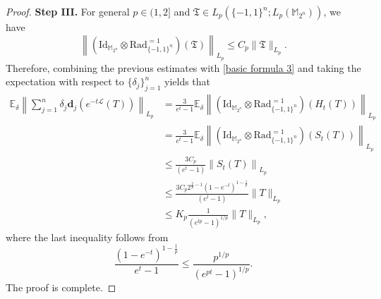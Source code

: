 \documentclass{amsbook}
\theoremstyle{definition}
\theoremstyle{remark}
\numberwithin{section}{chapter}
\numberwithin{equation}{chapter}
\newcommand{\M}{\mathbb{M}}
\newcommand{\1}{\mathbf{1}}
\newcommand{\dc}{\mathbf{d}}
\begin{document}
\begin{proof}
{\bf Step III.} For general $p\in(1,2]$ and $\mathfrak{T}\in  L_{p}(\{-1,1\}^{n};L_{p}(\M_{2^{n}}))$, we have
\[\left\|\left(\mathrm{Id}_{\M_{2^{n}}}\otimes \mathrm{Rad}^{=1}_{\{-1,1\}^{n}}\right)(\mathfrak{T})\right\|_{L_{p}}\leq C_p\|\mathfrak{T}\|_{L_{p}}.\] 
Therefore, combining the previous estimates with \eqref{basic formula 3} and taking the expectation with respect to $\{\delta_{j}\}_{j=1}^{n}$ yields that
\begin{equation}\label{basic formula 4}
\begin{split}
\mathbb{E}_{\delta}\left\|\sum_{j=1}^{n}\delta_{j}\dc_{j}(e^{-t\mathcal{L}}(T))\right\|_{L_{p}}&=\frac{3}{e^{t}-1}\mathbb{E}_{\delta}\left\|\left(\mathrm{Id}_{\M_{2^{n}}}\otimes \mathrm{Rad}^{=1}_{\{-1,1\}^{n}}\right)(H_{t}(T))\right\|_{L_{p}}\\
&=\frac{3}{e^{t}-1}\mathbb{E}_{\delta}\left\|\left(\mathrm{Id}_{\M_{2^{n}}}\otimes \mathrm{Rad}^{=1}_{\{-1,1\}^{n}}\right)(S_{t}(T))\right\|_{L_{p}}\\
&\leq \frac{3C_p}{(e^{t}-1)}\left\|S_{t}(T)\right\|_{L_{p}}\\
&\leq \frac{3C_p2^{\frac{2}{p}-1}(1-e^{-t})^{1-\frac{1}{p}}}{(e^{t}-1)}\|T\|_{L_{p}}\\
&\leq K_p\frac{1}{(e^{tp}-1)^{1/p}}\|T\|_{L_{p}},
\end{split}
\end{equation}
where the last inequality follows from
\[
\frac{(1-e^{-t})^{1-\frac1p}}{e^t-1}
\leq
\frac{p^{1/p}}{(e^{pt}-1)^{1/p}}.
\]
The proof is complete.
\end{proof}
\end{document}
